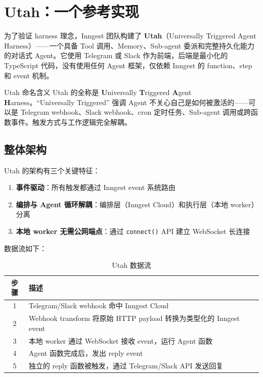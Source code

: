 \section{Utah：一个参考实现}

为了验证 harness 理念，Inngest 团队构建了 \textbf{Utah}（Universally Triggered Agent Harness）——一个具备 Tool 调用、Memory、Sub-agent 委派和完整持久化能力的对话式 Agent。它使用 Telegram 或 Slack 作为前端，后端是最小化的 TypeScript 代码，没有使用任何 Agent 框架，仅依赖 Inngest 的 function、step 和 event 机制。

\begin{knowledgebox}{Utah 命名含义}
Utah 的全称是 \textbf{U}niversally \textbf{T}riggered \textbf{A}gent \textbf{H}arness。``Universally Triggered'' 强调 Agent 不关心自己是如何被激活的——可以是 Telegram webhook、Slack webhook、cron 定时任务、Sub-agent 调用或跨函数事件。触发方式与工作逻辑完全解耦。
\end{knowledgebox}

\subsection{整体架构}

Utah 的架构有三个关键特征：

\begin{enumerate}
    \item \textbf{事件驱动}：所有触发都通过 Inngest event 系统路由
    \item \textbf{编排与 Agent 循环解耦}：编排层（Inngest Cloud）和执行层（本地 worker）分离
    \item \textbf{本地 worker 无需公网端点}：通过 \texttt{connect()} API 建立 WebSocket 长连接
\end{enumerate}

数据流如下：

\begin{table}[H]
\centering
\caption{Utah 数据流}
\begin{tabular}{cp{10cm}}
\toprule
\textbf{步骤} & \textbf{描述} \\
\midrule
1 & Telegram/Slack webhook 命中 Inngest Cloud \\
2 & Webhook transform 将原始 HTTP payload 转换为类型化的 Inngest event \\
3 & 本地 worker 通过 WebSocket 接收 event，运行 Agent 函数 \\
4 & Agent 函数完成后，发出 reply event \\
5 & 独立的 reply 函数被触发，通过 Telegram/Slack API 发送回复 \\
\bottomrule
\end{tabular}
\end{table}

